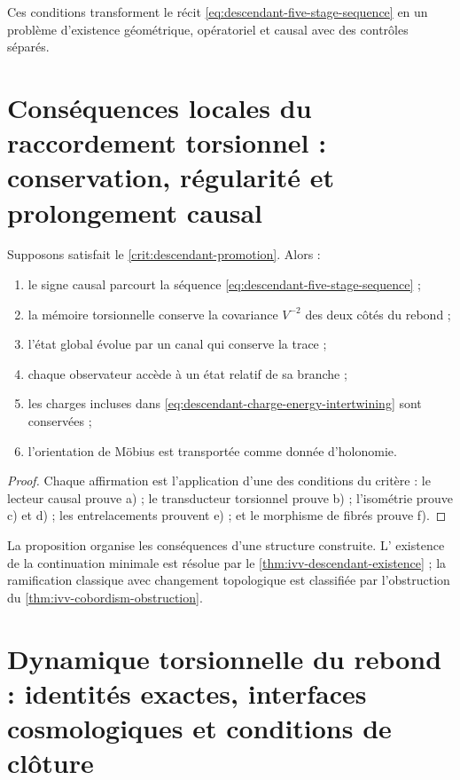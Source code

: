 Ces conditions transforment le récit
\cref{eq:descendant-five-stage-sequence} en un problème d'existence
géométrique, opératoriel et causal avec des contrôles séparés.

\section{Conséquences locales du raccordement torsionnel : conservation, régularité et prolongement causal}

\begin{proposition}
\label{prop:descendant-conditioned-consequences}
Supposons satisfait le
\cref{crit:descendant-promotion}. Alors :
\begin{enumerate}[label=\alph*)]
 \item le signe causal parcourt la séquence
       \cref{eq:descendant-five-stage-sequence} ;
 \item la mémoire torsionnelle conserve la covariance \(V^{-2}\) des deux
       côtés du rebond ;
 \item l'état global évolue par un canal qui conserve la trace ;
 \item chaque observateur accède à un état relatif de sa branche ;
 \item les charges incluses dans
       \cref{eq:descendant-charge-energy-intertwining} sont conservées ;
 \item l'orientation de Möbius est transportée comme donnée d'holonomie.
\end{enumerate}
\end{proposition}

\begin{proof}
Chaque affirmation est l'application d'une des conditions du critère :
le lecteur causal prouve a) ; le transducteur torsionnel prouve b) ; l'isométrie
prouve c) et d) ; les entrelacements prouvent e) ; et le morphisme de fibrés prouve
f).
\end{proof}

La proposition organise les conséquences d'une structure construite. L'
existence de la continuation minimale est résolue par le
\cref{thm:ivv-descendant-existence} ; la ramification classique avec changement
topologique est classifiée par l'obstruction du
\cref{thm:ivv-cobordism-obstruction}.

\section{Dynamique torsionnelle du rebond : identités exactes, interfaces cosmologiques et conditions de clôture}

